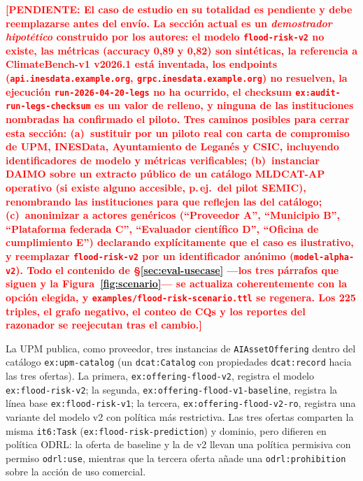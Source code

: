 \documentclass[Afour,sagev,times]{sagej}
\newcommand{\code}[1]{\texttt{#1}}
\newcommand{\TODO}[1]{\textcolor{red}{\textbf{[PENDIENTE: #1]}}}
\begin{document}
\TODO{El caso de estudio en su totalidad es pendiente y debe reemplazarse antes del envío. La sección actual es un \emph{demostrador hipotético} construido por los autores: el modelo \texttt{flood-risk-v2} no existe, las métricas (accuracy 0,89 y 0,82) son sintéticas, la referencia a ClimateBench-v1 v2026.1 está inventada, los endpoints (\texttt{api.inesdata.example.org}, \texttt{grpc.inesdata.example.org}) no resuelven, la ejecución \texttt{run-2026-04-20-legs} no ha ocurrido, el checksum \texttt{ex:audit-run-legs-checksum} es un valor de relleno, y ninguna de las instituciones nombradas ha confirmado el piloto. Tres caminos posibles para cerrar esta sección: (a)~sustituir por un piloto real con carta de compromiso de UPM, INESData, Ayuntamiento de Leganés y CSIC, incluyendo identificadores de modelo y métricas verificables; (b)~instanciar DAIMO sobre un extracto público de un catálogo MLDCAT-AP operativo (si existe alguno accesible, p.\,ej.\ del pilot SEMIC), renombrando las instituciones para que reflejen las del catálogo; (c)~anonimizar a actores genéricos (``Proveedor A'', ``Municipio B'', ``Plataforma federada C'', ``Evaluador científico D'', ``Oficina de cumplimiento E'') declarando explícitamente que el caso es ilustrativo, y reemplazar \texttt{flood-risk-v2} por un identificador anónimo (\texttt{model-alpha-v2}). Todo el contenido de §\ref{sec:eval-usecase} ---los tres párrafos que siguen y la Figura~\ref{fig:scenario}--- se actualiza coherentemente con la opción elegida, y \code{examples/flood-risk-scenario.ttl} se regenera. Los 225 triples, el grafo negativo, el conteo de CQs y los reportes del razonador se reejecutan tras el cambio.}

La UPM publica, como proveedor, tres instancias de \code{AIAssetOffering} dentro del catálogo \code{ex:upm-catalog} (un \code{dcat:Catalog} con propiedades \code{dcat:record} hacia las tres ofertas). La primera, \code{ex:offering-flood-v2}, registra el modelo \code{ex:flood-risk-v2}; la segunda, \code{ex:offering-flood-v1-baseline}, registra la línea base \code{ex:flood-risk-v1}; la tercera, \code{ex:offering-flood-v2-ro}, registra una variante del modelo v2 con política más restrictiva. Las tres ofertas comparten la misma \code{it6:Task} (\code{ex:flood-risk-prediction}) y dominio, pero difieren en política ODRL: la oferta de baseline y la de v2 llevan una política permisiva con permiso \code{odrl:use}, mientras que la tercera oferta añade una \code{odrl:prohibition} sobre la acción de uso comercial.
\end{document}
